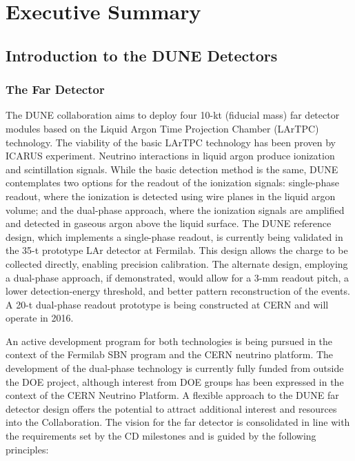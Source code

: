 \chapter{Executive Summary}
\label{ch:detectors-execsumm}



\section{Introduction to the DUNE Detectors}
\label{sec:intro-dune-det}

\subsection{The Far Detector}
\label{sec:intro-dune-far-det}

The DUNE collaboration aims to deploy four 10-kt (fiducial mass) far detector modules based on the Liquid Argon Time Projection Chamber (LArTPC) technology. The viability of the basic LArTPC technology has been proven by ICARUS experiment. Neutrino interactions in liquid argon produce ionization and scintillation signals. While the basic detection method is the same, DUNE contemplates two options for the readout of the ionization signals: single-phase readout, where the ionization is detected using wire planes in the liquid argon volume; and the dual-phase approach, where the ionization signals are amplified and detected in gaseous argon above the liquid surface. 
%
The DUNE reference design, which implements a single-phase readout, is currently being validated in the 35-t prototype LAr detector at Fermilab. This design allows the charge to be collected directly, enabling precision calibration.
 The alternate design, employing a dual-phase approach, if demonstrated, would allow for a 3-mm readout pitch, a lower detection-energy threshold, and better pattern reconstruction of the events. A 20-t dual-phase readout prototype is being constructed at CERN and will operate in 2016. 

An active development program for both technologies is being pursued in the context of the Fermilab SBN program and the CERN neutrino platform. The development of the dual-phase technology is currently fully funded from outside the DOE project, although interest from DOE groups has been expressed in the context of the CERN Neutrino Platform. A flexible approach to the DUNE far detector design offers the potential to attract additional interest and resources into the Collaboration. The vision for the far detector is consolidated in line with  the requirements set by the CD milestones and is guided by the following principles:

